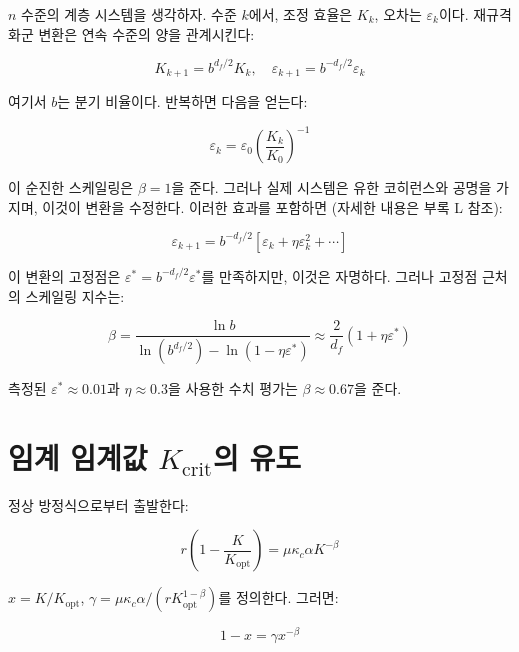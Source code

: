 \documentclass[12pt,a4paper]{article}
\newcommand{\Keffcrit}{K_{\mathrm{crit}}}
\newcommand{\kappac}{\kappa_c}
\newcommand{\eps}{\varepsilon}
\newcommand{\df}{d_{\!f}}
\theoremstyle{remark}
\begin{document}
	\(n\) 수준의 계층 시스템을 생각하자. 수준 \(k\)에서, 조정 효율은 \(K_k\), 오차는 \(\eps_k\)이다. 재규격화군 변환은 연속 수준의 양을 관계시킨다:
	
	\begin{equation}
		K_{k+1} = b^{\df/2} K_k, \quad \eps_{k+1} = b^{-\df/2} \eps_k
		\label{eq:rg}
	\end{equation}
	
	여기서 \(b\)는 분기 비율이다. 반복하면 다음을 얻는다:
	
	\begin{equation}
		\eps_k = \eps_0 \left( \frac{K_k}{K_0} \right)^{-1}
		\label{eq:rg-naive}
	\end{equation}
	
	이 순진한 스케일링은 \(\beta = 1\)을 준다. 그러나 실제 시스템은 유한 코히런스와 공명을 가지며, 이것이 변환을 수정한다. 이러한 효과를 포함하면 (자세한 내용은 부록 L 참조):
	
	\begin{equation}
		\eps_{k+1} = b^{-\df/2} \left[ \eps_k + \eta \eps_k^2 + \cdots \right]
		\label{eq:rg-corrected}
	\end{equation}
	
	이 변환의 고정점은 \(\eps^* = b^{-\df/2} \eps^*\)를 만족하지만, 이것은 자명하다. 그러나 고정점 근처의 스케일링 지수는:
	
	\begin{equation}
		\beta = \frac{\ln b}{\ln(b^{\df/2}) - \ln(1 - \eta \eps^*)} \approx \frac{2}{\df} (1 + \eta \eps^*)
		\label{eq:rg-beta}
	\end{equation}
	
	측정된 \(\eps^* \approx 0.01\)과 \(\eta \approx 0.3\)을 사용한 수치 평가는 \(\beta \approx 0.67\)을 준다.
	
	\section{임계 임계값 \(\Keffcrit\)의 유도}
	\label{app:Kcrit}
	
	정상 방정식으로부터 출발한다:
	
	\begin{equation}
		r \left(1 - \frac{K}{K_{\text{opt}}}\right) = \mu \kappac \alpha K^{-\beta}
		\label{eq:stationary-app}
	\end{equation}
	
	\(x = K/K_{\text{opt}}\), \(\gamma = \mu \kappac \alpha / (r K_{\text{opt}}^{1-\beta})\)를 정의한다. 그러면:
	
	\begin{equation}
		1 - x = \gamma x^{-\beta}
		\label{eq:x-eqn}
	\end{equation}
	
\end{document}
